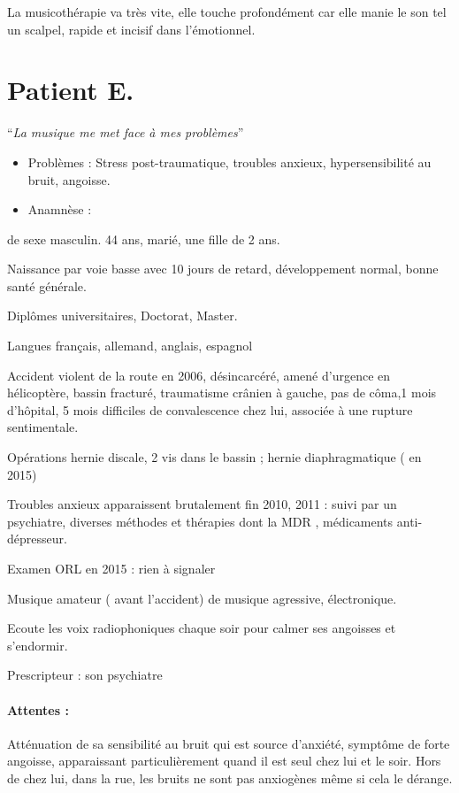 \documentclass[12pt,french]{report}
\newenvironment{lyxlist}[1]
{\begin{list}{}
{\settowidth{\labelwidth}{#1}
 \setlength{\leftmargin}{\labelwidth}
 \addtolength{\leftmargin}{\labelsep}
 \renewcommand{\makelabel}[1]{##1\hfil}}}
{\end{list}}
\begin{document}
La musicothérapie va très vite, elle touche profondément car elle
manie le son tel un scalpel, rapide et incisif dans l'émotionnel.

\section{Patient E.}

``\emph{La musique me met face à mes problèmes}''
\begin{itemize}
\item Problèmes : Stress post-traumatique, troubles anxieux, hypersensibilité
au bruit, angoisse.
\item Anamnèse : 
\end{itemize}
de sexe masculin. 44 ans, marié, une fille de 2 ans.
\begin{lyxlist}{00.00.0000}
\item [{Naissance}] par voie basse avec 10 jours de retard, développement
normal, bonne santé générale.
\item [{Diplômes}] universitaires, Doctorat, Master.
\item [{Langues}] français, allemand, anglais, espagnol
\item [{Accident}] violent de la route en 2006, désincarcéré, amené d'urgence
en hélicoptère, bassin fracturé, traumatisme crânien à gauche, pas
de côma,1 mois d'hôpital, 5 mois difficiles de convalescence chez
lui, associée à une rupture sentimentale.
\item [{Opérations}] hernie discale, 2 vis dans le bassin ; hernie diaphragmatique
( en 2015)
\item [{Troubles}] anxieux apparaissent brutalement fin 2010, 2011 : suivi
par un psychiatre, diverses méthodes et thérapies dont la MDR , médicaments
anti-dépresseur.
\item [{Examen}] ORL en 2015 : rien à signaler
\item [{Musique}] amateur ( avant l'accident) de musique agressive, électronique. 
\item [{Ecoute}] les voix radiophoniques chaque soir pour calmer ses angoisses
et s'endormir.
\item [{Prescripteur}] : son psychiatre
\end{lyxlist}

\paragraph{Attentes : }

Atténuation de sa sensibilité au bruit qui est source d'anxiété, symptôme
de forte angoisse, apparaissant particulièrement quand il est seul
chez lui et le soir. Hors de chez lui, dans la rue, les bruits ne
sont pas anxiogènes même si cela le dérange.
\end{document}
